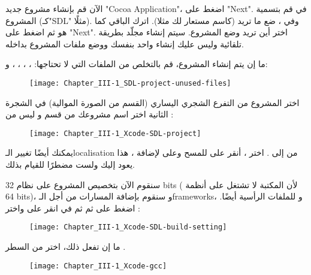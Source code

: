 الآن قم بإنشاء مشروع جديد
"\textenglish{Cocoa Application}"،
اضغط على
"\textenglish{Next}".
في 
قم بتسمية المشروع (كـ"\textenglish{SDL}"
مثلًا). وفي 
،
ضع ما تريد (كاسم مستعار لك مثلا). اترك الباقي كما هو ثم اضغط على 
"\textenglish{Next}".
اختر أين تريد وضع المشروع. سيتم إنشاء مجلّد بطريقة تلقائية وليس عليك إنشاء واحد بنفسك ووضع ملفات المشروع بداخله.

ما إن يتم إنشاء المشروع، قم بالتخلص من الملفات التي لا تحتاجها:
، ، ، ،  و:

\begin{figure}[H]
	\centering
	\texttt{[image: Chapter\_III-1\_SDL-project-unused-files]}
\end{figure}

اختر المشروع من التفرع الشجري اليساري (القسم
من الصورة الموالية) في الشجرة الثانية اختر اسم مشروعك من قسم 
و ليس من
:

\begin{figure}[H]
	\centering
	\texttt{[image: Chapter\_III-1\_Xcode-SDL-project]}
\end{figure}

يمكنك أيضًا تغيير الـ\textenglish{localisation}
من 
إلى 
.
اختر 
،
أنقر على
\InlineCode{-}
للمسح وعلى 
\InlineCode{+}
لإضافة 
،
هذا يعود إليك ولست مضطرًا للقيام بذلك.

سنقوم الآن بتخصيص المشروع على نظام
\textenglish{32 bits}
( لأن المكتبة لا تشتغل على أنظمة
\textenglish{64 bits})،
و سنقوم بإضافة المسارات من أجل الـ\textenglish{frameworks}،
و للملفات الرأسية أيضًا. اضغط على
ثم 
ثم في 
انقر على
 واختر
:

\begin{figure}[H]
	\centering
	\texttt{[image: Chapter\_III-1\_Xcode-SDL-build-setting]}
\end{figure}


ما إن تفعل ذلك، اختر
من السطر
.

\begin{figure}[H]
	\centering
	\texttt{[image: Chapter\_III-1\_Xcode-gcc]}
\end{figure}

